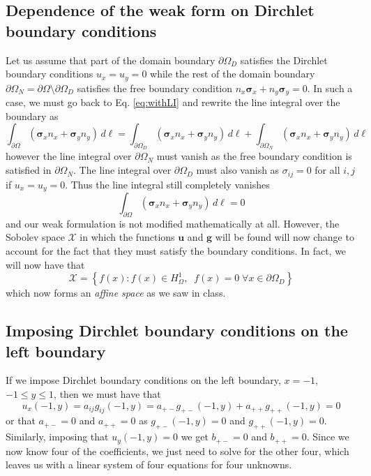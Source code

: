 \documentclass[11pt]{article}
\begin{document}
\subsection{Dependence of the weak form on Dirchlet boundary conditions}
Let us assume that part of the domain boundary $\partial\Omega_D$ satisfies the Dirchlet boundary conditions $u_x = u_y=0$ while the rest of the domain boundary $\partial\Omega_N = \partial\Omega \setminus \partial\Omega_D$ satisfies the free boundary condition $n_x\bm{\sigma}_x + n_y\bm{\sigma}_y = 0$. In such a case, we must go back to Eq. \eqref{eq:withLI} and rewrite the line integral over the boundary as
\begin{equation*}
\int_{\partial\Omega} \left( \bm{\sigma}_x n_x + \bm{\sigma}_y n_y \right) \, d\ell
=  \int_{\partial\Omega_D} \left( \bm{\sigma}_x n_x + \bm{\sigma}_y n_y \right) \, d\ell
+  \int_{\partial\Omega_N} \left( \bm{\sigma}_x n_x + \bm{\sigma}_y n_y \right) \, d\ell
\end{equation*}
however the line integral over $\partial\Omega_N$ must vanish as the free boundary condition is satisfied in $\partial\Omega_N$. The line integral over $\partial\Omega_D$ must also vanish as $\sigma_{ij} = 0$ for all $i,j$ if $u_x = u_y = 0$. Thus the line integral still completely vanishes
\begin{equation*}
\int_{\partial\Omega} \left( \bm{\sigma}_x n_x + \bm{\sigma}_y n_y \right) \, d\ell = 0
\end{equation*}
and our weak formulation is not modified mathematically at all. However, the Sobolev space $\mathcal{X}$ in which the functions $\bm{u}$ and $\bm{g}$ will be found will now change to account for the fact that they must satisfy the boundary conditions. In fact, we will now have that
\begin{equation}
\mathcal{X} = \left\{ f(x) : f(x) \in H^1_\Omega, \;\; f(x) = 0 \; \forall x \in \partial\Omega_D \right\}
\end{equation}
which now forms an \emph{affine space} as we saw in class.

\subsection{Imposing Dirchlet boundary conditions on the left boundary}
If we impose Dirchlet boundary conditions on the left boundary, $x=-1$, $-1 \le y \le 1$, then we must have that
\begin{equation*}
u_x(-1,y) = a_{ij}g_{ij}(-1,y) = a_{+-}g_{+-}(-1,y) + a_{++}g_{++}(-1,y) = 0
\end{equation*}
or that $a_{+-} = 0$ and $a_{++} = 0$ as $g_{+-}(-1,y) = 0$ and $g_{++}(-1,y) = 0$. Similarly, imposing that $u_y(-1,y) = 0$ we get $b_{+-} = 0$ and $b_{++} = 0$. Since we now know four of the coefficients, we just need to solve for the other four, which leaves us with a linear system of four equations for four unknowns.
\end{document}

